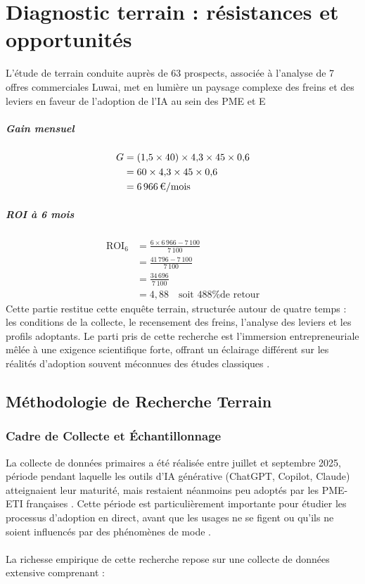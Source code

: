 \chapter{Diagnostic terrain : résistances et opportunités}
\label{chap:field_diagnosis}

L'étude de terrain conduite auprès de 63 prospects, associée à l'analyse de 7 offres commerciales Luwai, met en lumière un paysage complexe des freins et des leviers en faveur de l'adoption de l'IA au sein des PME et E\paragraph{Gain mensuel}
\begin{align}
G &= (1{,}5 \times 40) \times 4{,}3 \times 45 \times 0{,}6 \\
&= 60 \times 4{,}3 \times 45 \times 0{,}6 \\
&= 6\,966\,\text{\texteuro}/\text{mois}
\end{align}

\paragraph{ROI à 6 mois}
\begin{align}
\text{ROI}_6 &= \frac{6 \times 6\,966 - 7\,100}{7\,100} \\
&= \frac{41\,796 - 7\,100}{7\,100} \\
&= \frac{34\,696}{7\,100} \\
&= 4{,}88 \quad \text{soit 488\% de retour}
\end{align} Cette partie restitue cette enquête terrain, structurée autour de quatre temps : les conditions de la collecte, le recensement des freins, l'analyse des leviers et les profils adoptants. Le parti pris de cette recherche est l'immersion entrepreneuriale mêlée à une exigence scientifique forte, offrant un éclairage différent sur les réalités d'adoption souvent méconnues des études classiques \cite{yin2018case}.

\section{Méthodologie de Recherche Terrain}

\subsection{Cadre de Collecte et Échantillonnage}

La collecte de données primaires a été réalisée entre juillet et septembre 2025, période pendant laquelle les outils d’IA générative (ChatGPT, Copilot, Claude) atteignaient leur maturité, mais restaient néanmoins peu adoptés par les PME-ETI françaises \cite{bpifrance2025ia}. Cette période est particulièrement importante pour étudier les processus d’adoption en direct, avant que les usages ne se figent ou qu’ils ne soient influencés par des phénomènes de mode \cite{rogers2003diffusion}.
\\\\
La richesse empirique de cette recherche repose sur une collecte de données extensive comprenant :

